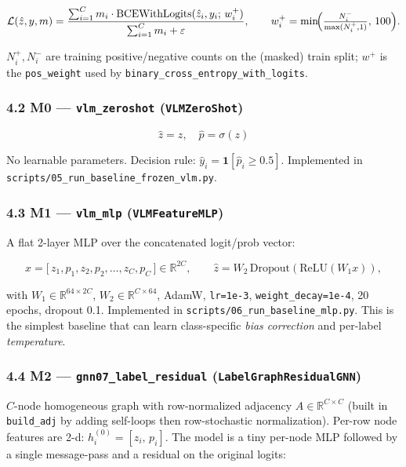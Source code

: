 \documentclass[
  11pt,
]{article}
\begin{document}
\[\mathcal{L}(\hat z, y, m)=\frac{\sum_{i=1}^{C} m_i \cdot \mathrm{BCEWithLogits}(\hat z_i, y_i;\,w^+_i)}{\sum_{i=1}^{C} m_i + \varepsilon},
\qquad
w^+_i=\min\!\Bigl(\tfrac{N^-_i}{\max(N^+_i,1)},\,100\Bigr).\]

\(N^+_i, N^-_i\) are training positive/negative counts on the (masked)
train split; \(w^+\) is the \texttt{pos\_weight} used by
\texttt{binary\_cross\_entropy\_with\_logits}.

\subsubsection{\texorpdfstring{4.2 M0 --- \texttt{vlm\_zeroshot}
(\texttt{VLMZeroShot})}{4.2 M0 --- vlm\_zeroshot (VLMZeroShot)}}\label{m0-vlm_zeroshot-vlmzeroshot}

\[\hat z=z,\quad \hat p=\sigma(z)\]

No learnable parameters. Decision rule:
\(\hat y_i=\mathbf{1}[\hat p_i \ge 0.5]\). Implemented in
\texttt{scripts/05\_run\_baseline\_frozen\_vlm.py}.

\subsubsection{\texorpdfstring{4.3 M1 --- \texttt{vlm\_mlp}
(\texttt{VLMFeatureMLP})}{4.3 M1 --- vlm\_mlp (VLMFeatureMLP)}}\label{m1-vlm_mlp-vlmfeaturemlp}

A flat 2-layer MLP over the concatenated logit/prob vector:

\[x=\bigl[\,z_1,p_1,z_2,p_2,\dots,z_C,p_C\,\bigr]\in\mathbb{R}^{2C},
\qquad
\hat z=W_2\,\mathrm{Dropout}(\mathrm{ReLU}(W_1 x)),\]

with \(W_1\in\mathbb{R}^{64\times 2C}\),
\(W_2\in\mathbb{R}^{C\times 64}\), AdamW, \texttt{lr=1e-3},
\texttt{weight\_decay=1e-4}, 20 epochs, dropout 0.1. Implemented in
\texttt{scripts/06\_run\_baseline\_mlp.py}. This is the simplest
baseline that can learn class-specific \emph{bias correction} and
per-label \emph{temperature}.

\subsubsection{\texorpdfstring{4.4 M2 ---
\texttt{gnn07\_label\_residual}
(\texttt{LabelGraphResidualGNN})}{4.4 M2 --- gnn07\_label\_residual (LabelGraphResidualGNN)}}\label{m2-gnn07_label_residual-labelgraphresidualgnn}

\(C\)-node homogeneous graph with row-normalized adjacency
\(A\in\mathbb{R}^{C\times C}\) (built in \texttt{build\_adj} by adding
self-loops then row-stochastic normalization). Per-row node features are
2-d: \(h^{(0)}_i=[z_i,\,p_i]\). The model is a tiny per-node MLP
followed by a single message-pass and a residual on the original logits:
\end{document}
